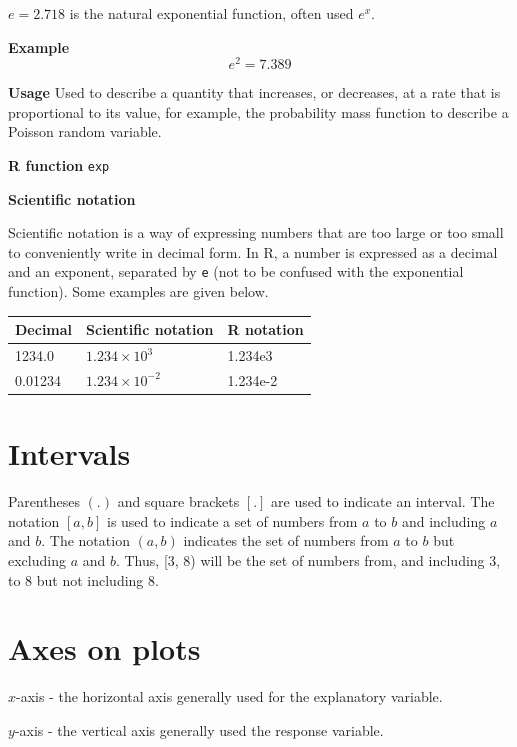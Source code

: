 \documentclass[
  oneside]{krantz}
\begin{document}
\(e = 2.718\) is the natural exponential function, often used \(e^x\).

\textbf{Example} \[e^2 = 7.389\]

\textbf{Usage} Used to describe a quantity that increases, or decreases, at a rate that is proportional to its value, for example, the probability mass function to describe a Poisson random variable.

\textbf{R function} \texttt{exp}

\textbf{Scientific notation}

Scientific notation is a way of expressing numbers that are too large or too small to conveniently write in decimal form. In R, a number is expressed as a decimal and an exponent, separated by \texttt{e} (not to be confused with the exponential function). Some examples are given below.

\begin{center}
\begin{tabular}{l|l|l}
Decimal & Scientific notation & R notation\\
\hline
1234.0 & $1.234 \times 10^3$ & 1.234e3\\
0.01234 & $1.234 \times 10^{-2}$ & \textrm{1.234e-2}\\
\end{tabular}
\end{center}

\hypertarget{intervals}{%
\section{Intervals}\label{intervals}}

Parentheses \((.)\) and square brackets \([.]\) are used to indicate an interval. The notation \([a, b]\) is used to indicate a set of numbers from \(a\) to \(b\) and including \(a\) and \(b\). The notation \((a, b)\) indicates the set of numbers from \(a\) to \(b\) but excluding \(a\) and \(b\). Thus, {[}3, 8) will be the set of numbers from, and including 3, to 8 but not including 8.

\hypertarget{axes-on-plots}{%
\section{Axes on plots}\label{axes-on-plots}}

\(x\)-axis - the horizontal axis generally used for the explanatory variable.

\(y\)-axis - the vertical axis generally used the response variable.
\end{document}
